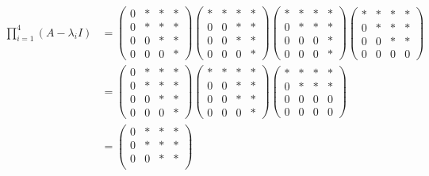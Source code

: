 \documentclass[a4paper]{article}
\begin{document}
\begin{align*}
  \prod_{i = 1}^4 (A - \lambda_i I) &=
  \begin{pmatrix}
    0 & * & * & *\\
    0 & * & * & *\\
    0 & 0 & * & *\\
    0 & 0 & 0 & *
  \end{pmatrix}
  \begin{pmatrix}
    * & * & * & *\\
    0 & 0 & * & *\\
    0 & 0 & * & *\\
    0 & 0 & 0 & *
  \end{pmatrix}
  \begin{pmatrix}
    * & * & * & *\\
    0 & * & * & *\\
    0 & 0 & 0 & *\\
    0 & 0 & 0 & *
  \end{pmatrix}
  \begin{pmatrix}
    * & * & * & *\\
    0 & * & * & *\\
    0 & 0 & * & *\\
    0 & 0 & 0 & 0
  \end{pmatrix}\\
  &=
  \begin{pmatrix}
    0 & * & * & *\\
    0 & * & * & *\\
    0 & 0 & * & *\\
    0 & 0 & 0 & *
  \end{pmatrix}
  \begin{pmatrix}
    * & * & * & *\\
    0 & 0 & * & *\\
    0 & 0 & * & *\\
    0 & 0 & 0 & *
  \end{pmatrix}
  \begin{pmatrix}
    * & * & * & *\\
    0 & * & * & *\\
    0 & 0 & 0 & 0\\
    0 & 0 & 0 & 0
  \end{pmatrix}\\
  &=
  \begin{pmatrix}
    0 & * & * & *\\
    0 & * & * & *\\
    0 & 0 & * & *\\

\end{pmatrix}
\end{align*}
\end{document}
